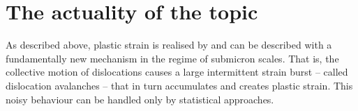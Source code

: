 



\section{The actuality of the topic} %

As described above, plastic strain is realised by and can be described with a fundamentally new mechanism in the regime of submicron scales. That is, the collective motion of dislocations causes a large intermittent strain burst -- called dislocation avalanches -- that in turn accumulates and creates plastic strain. This noisy behaviour can be handled only by statistical approaches.

